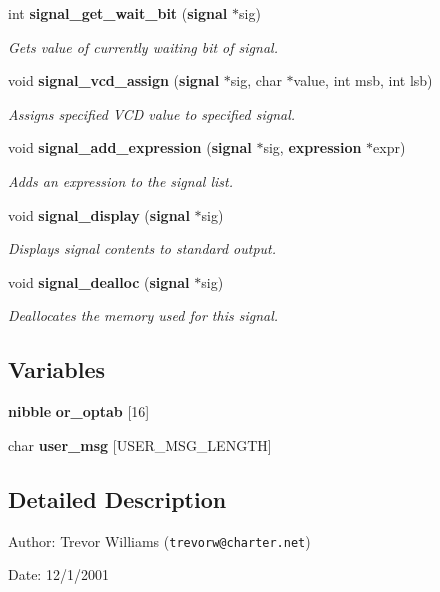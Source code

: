 \begin{CompactItemize}
int {\bf signal\_\-get\_\-wait\_\-bit} ({\bf signal} $\ast$sig)
\begin{CompactList}\small\item\em Gets value of currently waiting bit of signal. \item\end{CompactList}\item 
void {\bf signal\_\-vcd\_\-assign} ({\bf signal} $\ast$sig, char $\ast$value, int msb, int lsb)
\begin{CompactList}\small\item\em Assigns specified VCD value to specified signal. \item\end{CompactList}\item 
void {\bf signal\_\-add\_\-expression} ({\bf signal} $\ast$sig, {\bf expression} $\ast$expr)
\begin{CompactList}\small\item\em Adds an expression to the signal list. \item\end{CompactList}\item 
void {\bf signal\_\-display} ({\bf signal} $\ast$sig)
\begin{CompactList}\small\item\em Displays signal contents to standard output. \item\end{CompactList}\item 
void {\bf signal\_\-dealloc} ({\bf signal} $\ast$sig)
\begin{CompactList}\small\item\em Deallocates the memory used for this signal. \item\end{CompactList}\end{CompactItemize}
\subsection*{Variables}
\begin{CompactItemize}
\item 
{\bf nibble} {\bf or\_\-optab} [16]
\item 
char {\bf user\_\-msg} [USER\_\-MSG\_\-LENGTH]
\end{CompactItemize}


\subsection{Detailed Description}
\begin{Desc}
\item[Author:]Trevor Williams ({\tt trevorw@charter.net}) \end{Desc}
\begin{Desc}
\item[Date:]12/1/2001\end{Desc}


